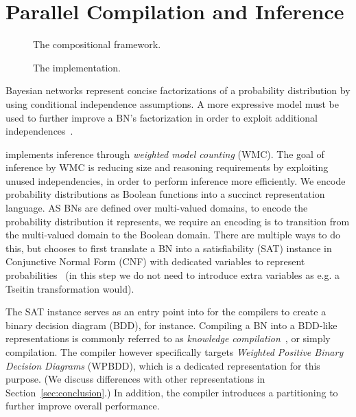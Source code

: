 

\section{Parallel Compilation and Inference}
\label{secjjparallel}

\begin{figure}[!t]
    \centering
    \scalebox{0.6}{
        
    }
    \caption{The compositional framework.}
    \label{fig:frameworkoverview}
\end{figure}

\begin{figure}[!t]
    \centering
    
    \caption{The implementation.}
    \label{fig:implementation}
\end{figure}

Bayesian networks represent concise factorizations of a probability distribution by using conditional independence assumptions. A more expressive model must be used to further improve a BN's factorization in order to exploit additional independences~\cite{zhang1996exploiting,boutilier1996context,friedman1998learning}.

\toolname implements inference through \emph{weighted model counting} (WMC). The goal of inference by WMC is reducing size and reasoning requirements by exploiting unused independencies, in order to perform inference more efficiently. We encode probability distributions as Boolean functions into a succinct representation language.
AS BNs are defined over multi-valued domains, to encode the probability distribution it represents, we require an encoding is to transition from the multi-valued domain to the Boolean domain. There are multiple ways to do this, but \toolname chooses to first translate a BN into a satisfiability (SAT) instance in Conjunctive Normal Form (CNF) with dedicated variables to represent probabilities~\cite{dal2017wpbdd} (in this step we do not need to introduce extra variables as e.g. a Tseitin transformation would).

The SAT instance serves as an entry point into for the compilers to create a binary decision diagram (BDD), for instance. Compiling a BN into a BDD-like representations is commonly referred to as \emph{knowledge compilation}~\cite{darwiche2002knowledge}, or simply compilation. The \toolname compiler however specifically targets \emph{Weighted Positive Binary Decision Diagrams} (WPBDD), which is a dedicated representation for this purpose. (We discuss differences with other representations in Section~\ref{sec:conclusion}.)
	In addition, the compiler introduces a partitioning to further improve overall performance.

